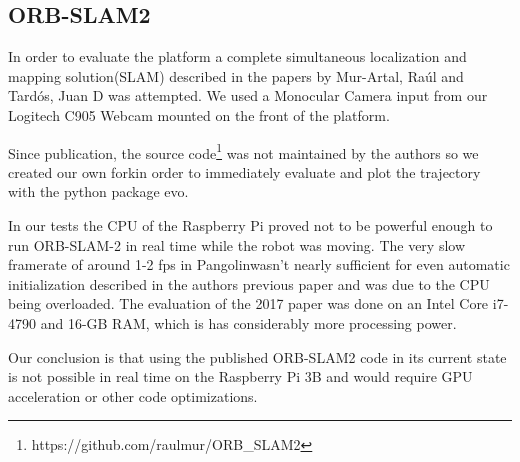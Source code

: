 \documentclass[class=report, crop=false]{standalone}
\begin{document}
\subsection{ORB-SLAM2}\label{subsec:orbslam2}

In order to evaluate the platform a complete simultaneous localization and mapping solution(SLAM) described in the papers\cite{mur2017orb}\cite{mur2015orb} by Mur-Artal, Ra\'ul and Tard{\'o}s, Juan D was attempted. We used a Monocular Camera input from our Logitech C905 Webcam mounted on the front of the platform.

Since publication, the source code\footnote{https://github.com/raulmur/ORB\_SLAM2} was not maintained by the authors so we created our own fork\footnotemark in order to immediately evaluate and plot the trajectory with the python package evo\cite{grupp2017evo}.


In our tests the CPU of the Raspberry Pi proved not to be powerful enough to run ORB-SLAM-2 in real time while the robot was moving. The very slow framerate of around 1-2 fps in Pangolin\footnotemark wasn't nearly sufficient for even automatic initialization described in the authors previous paper\cite{mur2015orb} and was due to the CPU being overloaded. The evaluation of the 2017 paper\cite{mur2017orb} was done on an Intel Core i7-4790 and 16-GB RAM, which is has considerably more processing power.


Our conclusion is that using the published ORB-SLAM2 code in its current state is not possible in real time on the Raspberry Pi 3B and would require GPU acceleration or other code optimizations.
\end{document}
